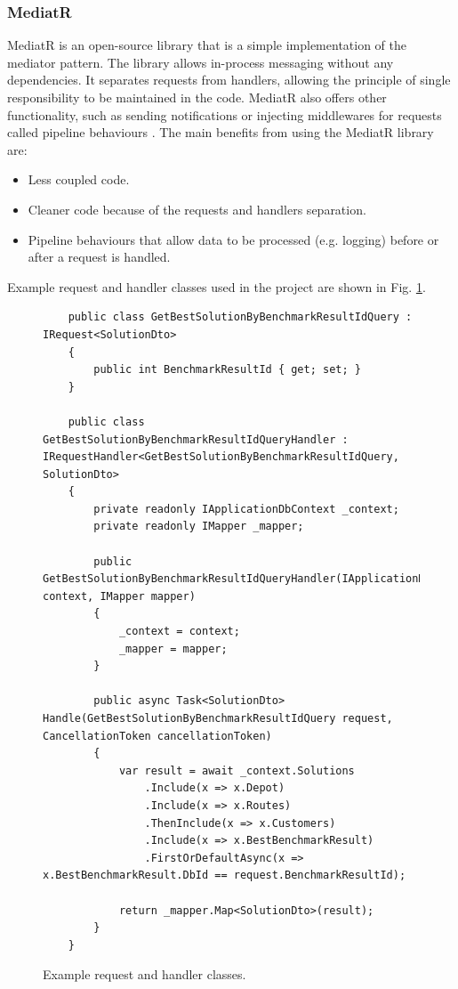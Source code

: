 \documentclass[a4paper,twoside,12pt]{book}
\begin{document}
\subsubsection{MediatR}
MediatR is an open-source library that is a simple implementation of the mediator pattern. The library allows in-process messaging without any dependencies. It separates requests from handlers, allowing the principle of single responsibility to be maintained in the code.
MediatR also offers other functionality, such as sending notifications or injecting middlewares for requests called pipeline behaviours \cite{bib:mediatR}.
The main benefits from using the MediatR library are: 
\begin{itemize}
\item Less coupled code.
\item Cleaner code because of the requests and handlers separation.
\item Pipeline behaviours that allow data to be processed (e.g. logging) before or after a request is handled.
\end{itemize}

Example request and handler classes used in the project are shown in Fig. \ref{fig:mediatR}.

\begin{figure}
\centering
\begin{lstlisting}
    public class GetBestSolutionByBenchmarkResultIdQuery : IRequest<SolutionDto>
    {
        public int BenchmarkResultId { get; set; }
    }

    public class GetBestSolutionByBenchmarkResultIdQueryHandler : IRequestHandler<GetBestSolutionByBenchmarkResultIdQuery, SolutionDto>
    {
        private readonly IApplicationDbContext _context;
        private readonly IMapper _mapper;

        public GetBestSolutionByBenchmarkResultIdQueryHandler(IApplicationDbContext context, IMapper mapper)
        {
            _context = context;
            _mapper = mapper;
        }

        public async Task<SolutionDto> Handle(GetBestSolutionByBenchmarkResultIdQuery request, CancellationToken cancellationToken)
        {
            var result = await _context.Solutions
                .Include(x => x.Depot)
                .Include(x => x.Routes)
                .ThenInclude(x => x.Customers)
                .Include(x => x.BestBenchmarkResult)
                .FirstOrDefaultAsync(x => x.BestBenchmarkResult.DbId == request.BenchmarkResultId);

            return _mapper.Map<SolutionDto>(result);
        }
    }
\end{lstlisting}
\caption{Example request and handler classes.}
\label{fig:mediatR}
\end{figure}
\end{document}
